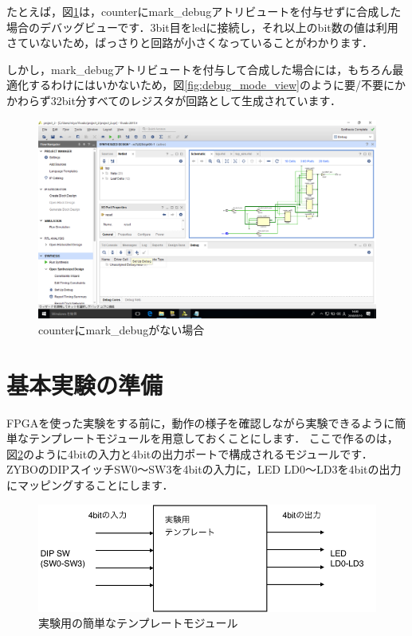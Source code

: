 \documentclass[a4paper,dvipdfmx]{jsarticle}
\begin{document}
たとえば，図\ref{fig:without_mark_debug}は，counterにmark\_debugアトリビュートを付与せずに合成した場合のデバッグビューです．3bit目をledに接続し，それ以上のbit数の値は利用さていないため，ばっさりと回路が小さくなっていることがわかります．

しかし，mark\_debugアトリビュートを付与して合成した場合には，もちろん最適化するわけにはいかないため，図\ref{fig:debug_mode_view}のように要/不要にかかわらず32bit分すべてのレジスタが回路として生成されています．

 \begin{figure}[H]
  \begin{center}
   \includegraphics[width=.8\textwidth]{chapter05_figures/VirtualBox_Windows10_19_03_2018_14_00_24.png}
  \end{center}
  \caption{counterにmark\_debugがない場合 \label{fig:without_mark_debug}}
 \end{figure}


\section{基本実験の準備}
FPGAを使った実験をする前に，動作の様子を確認しながら実験できるように簡単なテンプレートモジュールを用意しておくことにします．
ここで作るのは，図\ref{fig:experiment_template}のように4bitの入力と4bitの出力ポートで構成されるモジュールです．
ZYBOのDIPスイッチSW0〜SW3を4bitの入力に，LED LD0〜LD3を4bitの出力にマッピングすることにします．

 \begin{figure}[H]
  \begin{center}
   \includegraphics[width=.6\textwidth]{chapter05_figures/experiment_template.png}
  \end{center}  
  \caption{実験用の簡単なテンプレートモジュール \label{fig:experiment_template}}
 \end{figure}
\end{document}

